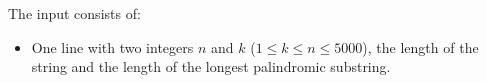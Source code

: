 
    The input consists of:
    \begin{itemize}
        \item One line with two integers $n$ and $k$ ($1\leq k\leq n\leq 5000$), the
            length of the string and the length of the longest palindromic
            substring.
    \end{itemize}
